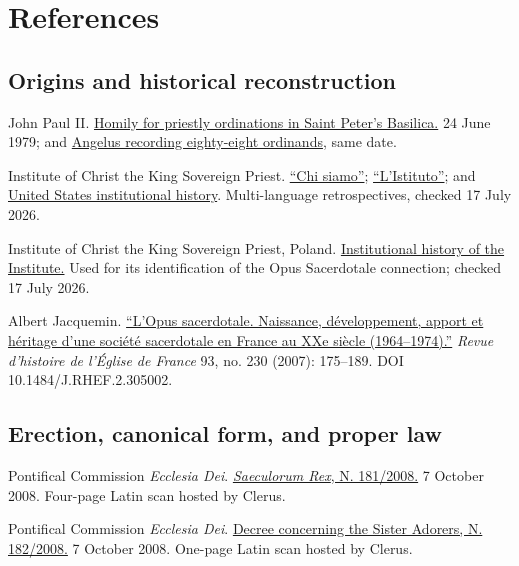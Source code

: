 \section{References}

\subsection{Origins and historical reconstruction}

John Paul II. \href{https://www.vatican.va/content/john-paul-ii/en/homilies/1979/documents/hf_jp-ii_hom_19790624_ordinazioni-sacerd.html}{Homily for priestly ordinations in Saint Peter's Basilica.} 24 June 1979; and \href{https://www.vatican.va/content/john-paul-ii/en/angelus/1979/documents/hf_jp-ii_ang_19790624.html}{Angelus recording eighty-eight ordinands}, same date.

Institute of Christ the King Sovereign Priest. \href{https://www.icrss.it/info/chi-siamo/}{``Chi siamo''}; \href{https://www.icrss.it/info/}{``L'Istituto''}; and \href{https://www.institute-christ-king.org/history}{United States institutional history}. Multi-language retrospectives, checked 17 July 2026.

Institute of Christ the King Sovereign Priest, Poland. \href{https://www.icrss.pl/instytut/o-instytucie}{Institutional history of the Institute.} Used for its identification of the Opus Sacerdotale connection; checked 17 July 2026.

Albert Jacquemin. \href{https://www.persee.fr/doc/rhef_0048-7988_2007_num_93_230_4329}{``L'Opus sacerdotale. Naissance, développement, apport et héritage d'une société sacerdotale en France au XXe siècle (1964--1974).''} \emph{Revue d'histoire de l'Église de France} 93, no. 230 (2007): 175--189. DOI 10.1484/J.RHEF.2.305002.

\subsection{Erection, canonical form, and proper law}

Pontifical Commission \emph{Ecclesia Dei}. \href{https://www.clerus.org/clerus/dati/2008-10/07-20/Decreto_approvazione_7.10.08.pdf}{\emph{Saeculorum Rex}, N. 181/2008.} 7 October 2008. Four-page Latin scan hosted by Clerus.

Pontifical Commission \emph{Ecclesia Dei}. \href{https://www.clerus.org/clerus/dati/2008-10/17-20/Decreto_approvazione_b\%29_7\%5B1\%5D.10.08.pdf}{Decree concerning the Sister Adorers, N. 182/2008.} 7 October 2008. One-page Latin scan hosted by Clerus.

